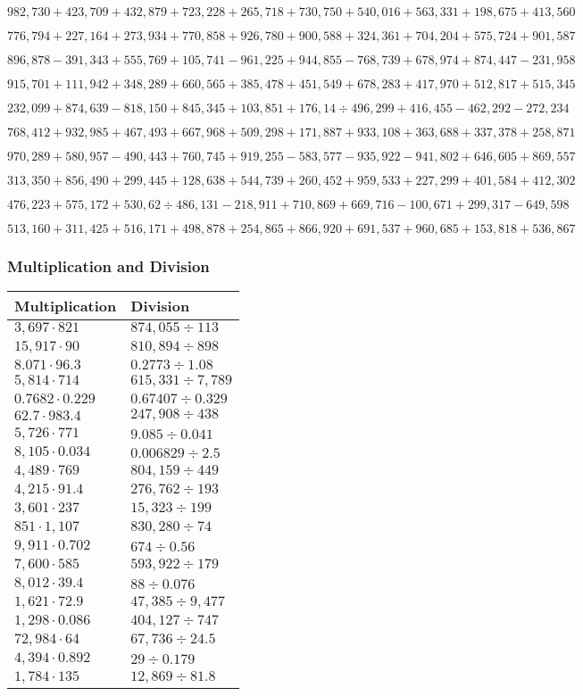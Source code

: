 \(982,730+423,709+432,879+723,228+265,718+730,750+540,016+563,331+198,675+ 413,560\)

\(776,794+227,164+273,934+770,858+926,780+900,588+324,361+704,204+575,724+901,587\)

\(896,878-391,343+555,769+105,741-961,225+944,855-768,739+678,974+874,447-231,958\)

\(915,701+111,942+348,289+660,565+385,478+451,549+678,283+417,970+512,817+515,345\)

\(232,099+874,639-818,150+845,345+103,851+176,14÷496,299+416,455-462,292-272,234\)

\(768,412+932,985+467,493+667,968+509,298+171,887+933,108+363,688+337,378+258,871\)

\(970,289+580,957-490,443+760,745+919,255-583,577-935,922-941,802+646,605+869,557\)

\(313,350+856,490+299,445+128,638+544,739+260,452+959,533+227,299+401,584+412,302\)

\(476,223+575,172+530,62÷486,131-218,911+710,869+669,716-100,671+299,317-649,598\)

\(513,160+311,425+516,171+498,878+254,865+866,920+691,537+960,685+153,818+536,867\)

\hypertarget{multiplication-and-division-331}{%
\subsubsection{Multiplication and
Division}\label{multiplication-and-division-331}}

\begin{longtable}[]{@{}ll@{}}
\toprule
Multiplication & Division\tabularnewline
\midrule
\endhead
\(3,697\cdot821\) & \(874,055÷113\)\tabularnewline
\(15,917\cdot90\) & \(810,894÷898\)\tabularnewline
\(8.071\cdot96.3\) & \(0.2773÷1.08\)\tabularnewline
\(5,814\cdot714\) & \(615,331÷7,789\)\tabularnewline
\(0.7682\cdot0.229\) & \(0.67407÷0.329\)\tabularnewline
\(62.7\cdot983.4\) & \(247,908÷438\)\tabularnewline
\(5,726\cdot771\) & \(9.085÷0.041\)\tabularnewline
\(8,105\cdot0.034\) & \(0.006829÷2.5\)\tabularnewline
\(4,489\cdot769\) & \(804,159÷449\)\tabularnewline
\(4,215\cdot91.4\) & \(276,762÷193\)\tabularnewline
\(3,601\cdot237\) & \(15,323÷199\)\tabularnewline
\(851\cdot1,107\) & \(830,280÷74\)\tabularnewline
\(9,911\cdot0.702\) & \(674÷0.56\)\tabularnewline
\(7,600\cdot585\) & \(593,922÷179\)\tabularnewline
\(8,012\cdot39.4\) & \(88÷0.076\)\tabularnewline
\(1,621\cdot72.9\) & \(47,385÷9,477\)\tabularnewline
\(1,298\cdot0.086\) & \(404,127÷747\)\tabularnewline
\(72,984\cdot64\) & \(67,736÷24.5\)\tabularnewline
\(4,394\cdot0.892\) & \(29÷0.179\)\tabularnewline
\(1,784\cdot135\) & \(12,869÷81.8\)\tabularnewline
\bottomrule
\end{longtable}

